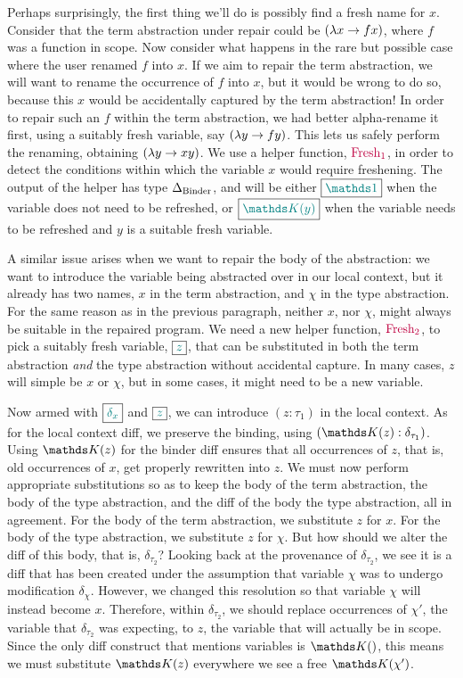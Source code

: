 Perhaps surprisingly, the first thing we'll do is possibly find a fresh name for
$x$.  Consider that the term abstraction under repair could be $({\lambda} {x} \rightarrow f
x)$, where $f$ was a function in scope.  Now consider what happens in the rare
but possible case where the user renamed $f$ into $x$.  If we aim to repair the
term abstraction, we will want to rename the occurrence of $f$ into $x$, but it
would be wrong to do so, because this $x$ would be accidentally captured by the
term abstraction!  In order to repair such an $f$ within the term abstraction,
we had better alpha-rename it first, using a suitably fresh variable, say
$({\lambda} {y} \rightarrow f y)$.  This lets us safely perform the renaming, obtaining
$({\lambda} {y} \rightarrow x y)$.  We use a helper function, $\textcolor{purple}{\text{Fresh}_1}$, in order to
detect the conditions within which the variable $x$ would require freshening.
The output of the helper has type $\Delta_{\normalfont \text{Binder}}$, and will be either
$\out{\MathSame{}}$ when the variable does not need to be refreshed, or
$\out{\MathReplace{y}}$ when the variable needs to be refreshed and $y$ is a
suitable fresh variable.

A similar issue arises when we want to repair the body of the abstraction: we
want to introduce the variable being abstracted over in our local context, but
it already has two names, $x$ in the term abstraction, and $\chi$ in the type
abstraction.  For the same reason as in the previous paragraph, neither $x$, nor
$\chi$, might always be suitable in the repaired program.  We need a new helper
function, $\textcolor{purple}{\text{Fresh}_2}$, to pick a suitably fresh variable, $\boxed{ \textcolor{teal}{z} }$, that can
be substituted in both the term abstraction \emph{and} the type abstraction
without accidental capture.  In many cases, $z$ will simple be $x$ or $\chi$,
but in some cases, it might need to be a new variable.

Now armed with $\boxed{ \textcolor{teal}{\delta_x} }$ and $\boxed{ \textcolor{teal}{z} }$, we can introduce $(z : \tau_1)$
in the local context.  As for the local context diff, we preserve the binding,
using $\MathLocalAssum{\MathReplace{z}}{\delta_{\tau_{1}}}$.  Using
$\MathReplace{z}$ for the binder diff ensures that all occurrences of $z$, that
is, old occurrences of $x$, get properly rewritten into $z$.  We must now
perform appropriate substitutions so as to keep the body of the term
abstraction, the body of the type abstraction, and the diff of the body the type
abstraction, all in agreement.  For the body of the term abstraction, we
substitute $z$ for $x$.  For the body of the type abstraction, we substitute $z$
for $\chi$.  But how should we alter the diff of this body, that is,
$\delta_{\tau_{2}}$?  Looking back at the provenance of $\delta_{\tau_{2}}$, we
see it is a diff that has been created under the assumption that variable $\chi$
was to undergo modification $\delta_{\chi}$.  However, we changed this
resolution so that variable $\chi$ will instead become $x$.  Therefore, within
$\delta_{\tau_{2}}$, we should replace occurrences of $\chi'$, the variable that
$\delta_{\tau_{2}}$ was expecting, to $z$, the variable that will actually be in
scope.  Since the only diff construct that mentions variables is
$\MathReplace{}$, this means we must substitute $\MathReplace{z}$ everywhere we
see a free $\MathReplace{\chi'}$.

